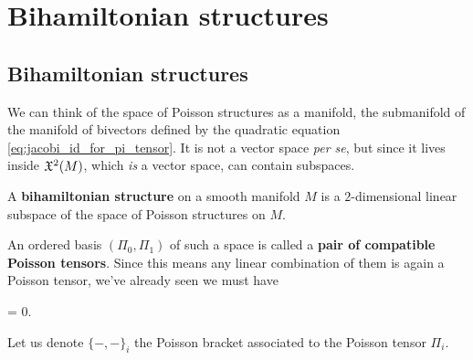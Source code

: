 \documentclass[main.tex]{subfiles}
\begin{document}
\chapter{Bihamiltonian structures}
\section{Bihamiltonian structures}
We can think of the space of Poisson structures as a manifold, the submanifold of the manifold of bivectors defined by the quadratic equation \eqref{eq:jacobi_id_for_pi_tensor}. It is not a vector space \emph{per se}, but since it lives inside $\mathfrak{X}^2(M)$, which \emph{is} a vector space, can contain subspaces.

\begin{definition}
	A \textbf{bihamiltonian structure} on a smooth manifold $M$ is a $2$-dimensional linear subspace of the space of Poisson structures on $M$.
\end{definition}

An ordered basis $(\Pi_0, \Pi_1)$ of such a space is called a \textbf{pair of compatible Poisson tensors}. Since this means any linear combination of them is again a Poisson tensor, we've already seen we must have
\begin{eqalign}
	[\Pi_0, \Pi_1] = 0.
\end{eqalign}

Let us denote $\{-,-\}_i$ the Poisson bracket associated to the Poisson tensor $\Pi_i$.
\end{document}
